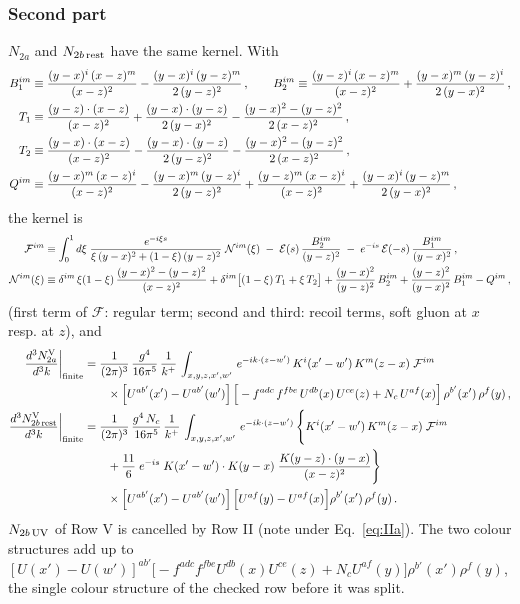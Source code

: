 \documentclass[9pt]{article}
\numberwithin{equation}{section}
\begin{document}
\subsubsection*{Second part}
\noindent $N_{2a}$ and $N_{2b\,\rm rest}$ have the same kernel. With
\begin{align}
B_{1}^{im}&\equiv\frac{(y-x)^{i}\,(x-z)^{m}}{(x-z)^{2}}-\frac{(y-x)^{i}\,(y-z)^{m}}{2\,(y-z)^{2}}\,,\qquad
B_{2}^{im}\equiv\frac{(y-z)^{i}\,(x-z)^{m}}{(x-z)^{2}}+\frac{(y-x)^{m}\,(y-z)^{i}}{2\,(y-x)^{2}}\,,\notag\\
T_{1}&\equiv\frac{(y-z)\cdot (x-z)}{(x-z)^{2}}+\frac{(y-x)\cdot (y-z)}{2\,(y-x)^{2}}-\frac{(y-x)^{2}-(y-z)^{2}}{2\,(x-z)^{2}}\,,\notag\\
T_{2}&\equiv\frac{(y-x)\cdot (x-z)}{(x-z)^{2}}-\frac{(y-x)\cdot (y-z)}{2\,(y-z)^{2}}-\frac{(y-x)^{2}-(y-z)^{2}}{2\,(x-z)^{2}}\,,\notag\\
Q^{im}&\equiv\frac{(y-x)^{m}\,(x-z)^{i}}{(x-z)^{2}}-\frac{(y-x)^{m}\,(y-z)^{i}}{2\,(y-z)^{2}}+\frac{(y-z)^{m}\,(x-z)^{i}}{(x-z)^{2}}+\frac{(y-x)^{i}\,(y-z)^{m}}{2\,(y-x)^{2}}\,,\notag
\end{align}
the kernel is
\begin{align}
\mathcal{F}^{im}&\equiv\int_{0}^{1}d\xi\;\frac{e^{-i\xi s}}{\xi\,(y-x)^{2}+(1-\xi)\,(y-z)^{2}}\;\mathcal{N}^{im}(\xi)\;-\;\mathcal{E}(s)\,\frac{B_{2}^{im}}{(y-z)^{2}}\;-\;e^{-is}\,\mathcal{E}(-s)\,\frac{B_{1}^{im}}{(y-x)^{2}}\,,\label{eq:F}\\
\mathcal{N}^{im}(\xi)&\equiv\delta^{im}\,\xi(1-\xi)\,\frac{(y-x)^{2}-(y-z)^{2}}{(x-z)^{2}}+\delta^{im}\big[(1-\xi)\,T_{1}+\xi\,T_{2}\big]+\frac{(y-x)^{2}}{(y-z)^{2}}\,B_{2}^{im}+\frac{(y-z)^{2}}{(y-x)^{2}}\,B_{1}^{im}-Q^{im}\,,\notag
\end{align}
(first term of $\mathcal{F}$: regular term; second and third: recoil terms, soft gluon at $x$ resp. at $z$), and
\begin{align}
\frac{d^{3}N_{2a}^{\rm V}}{d^{3}k}\bigg|_{\rm finite}  & =  \frac{1}{(2\pi)^{3}}\, \frac{g^{4}}{16\pi^{5}}\,\frac{1}{k^{+}}\,\int_{x,y,z,x',w'}\, e^{-ik\cdot(z-w')}\,K^{i}(x'-w')\,K^{m}(z-x)\;\mathcal{F}^{im}\notag \\
&\qquad\times \Big[U^{ab'}(x')-U^{ab'}(w')\Big]\,\Big[-f^{adc}\,f^{fbe}\,U^{db}(x)\,U^{ce}(z)+N_{c}\,U^{af}(x)\Big]\,\rho^{b'}(x')\,\rho^{f}(y)\,,\label{eq:V2a}\\
\frac{d^{3}N_{2b\,\rm rest}^{\rm V}}{d^{3}k}\bigg|_{\rm finite}  & =  \frac{1}{(2\pi)^{3}}\, \frac{g^{4}\,N_{c}}{16\pi^{5}}\,\frac{1}{k^{+}}\,\int_{x,y,z,x',w'}\, e^{-ik\cdot(z-w')}\,\Bigg\{K^{i}(x'-w')\,K^{m}(z-x)\;\mathcal{F}^{im}\notag\\
&\qquad+\frac{11}{6}\;e^{-is}\;K(x'-w')\cdot K(y-x)\;\frac{K(y-z)\cdot(y-x)}{(x-z)^{2}}\Bigg\}\notag\\
&\qquad\times\Big[U^{ab'}(x')-U^{ab'}(w')\Big]\,\Big[U^{af}(y)-U^{af}(x)\Big]\rho^{b'}(x')\,\rho^{f}(y)\,.\label{eq:V2b}
\end{align}
$N_{2b\,\rm UV}$ of Row V is cancelled by Row II (note under Eq.~\eqref{eq:IIa}). The two colour structures add up to $[U(x')-U(w')]^{ab'}\big[-f^{adc}f^{fbe}U^{db}(x)U^{ce}(z)+N_{c}U^{af}(y)\big]\rho^{b'}(x')\rho^{f}(y)$, the single colour structure of the checked row before it was split.
\end{document}
